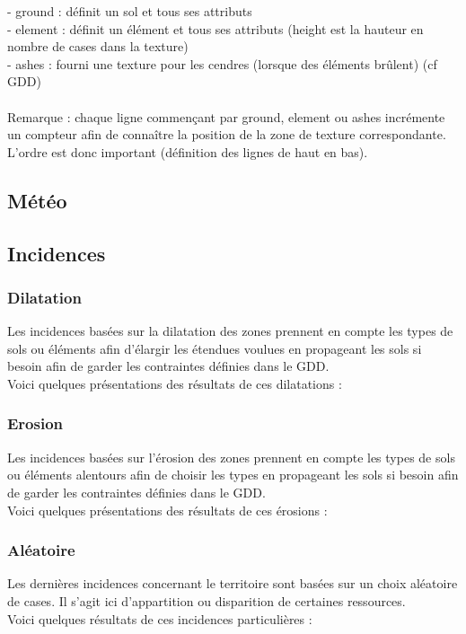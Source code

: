\documentclass[a4paper]{article}
\newcommand{\alinea}{\hspace*{0.5cm}}
\begin{document}
        - ground : définit un sol et tous ses attributs\\
        - element : définit un élément et tous ses attributs (height est la hauteur en nombre de cases dans la texture)\\
        - ashes : fourni une texture pour les cendres (lorsque des éléments brûlent) (cf GDD)\\
        \\
        Remarque : chaque ligne commençant par ground, element ou ashes incrémente un compteur afin de connaître la position de la zone de texture correspondante. L'ordre est donc important (définition des lignes de haut en bas).

      \subsection{Météo}
      
      \subsection{Incidences}
        \subsubsection{Dilatation}
          \alinea Les incidences basées sur la dilatation des zones prennent en compte les types de sols ou éléments afin d'élargir les étendues voulues en propageant les sols si besoin afin de garder les contraintes définies dans le GDD.\\
          \alinea Voici quelques présentations des résultats de ces dilatations :\\
        
        \subsubsection{Erosion}
          \alinea Les incidences basées sur l'érosion des zones prennent en compte les types de sols ou éléments alentours afin de choisir les types en propageant les sols si besoin afin de garder les contraintes définies dans le GDD.\\
          \alinea Voici quelques présentations des résultats de ces érosions :\\
        
        \subsubsection{Aléatoire}
          \alinea Les dernières incidences concernant le territoire sont basées sur un choix aléatoire de cases. Il s'agit ici d'appartition ou disparition de certaines ressources.\\
          \alinea Voici quelques résultats de ces incidences particulières :\\
\end{document}
